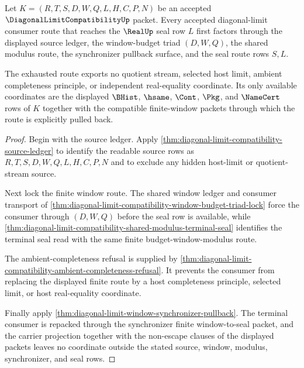 \begin{theorem}
\label{thm:diagonal-limit-compatibility-window-source-exhaustion}
Let $K=(R,T,S,D,W,Q,L,H,C,P,N)$ be an accepted $\DiagonalLimitCompatibilityUp$ packet. Every accepted diagonal-limit consumer route that reaches the $\RealUp$ seal row $L$ first factors through the displayed source ledger, the window-budget triad $(D,W,Q)$, the shared modulus route, the synchronizer pullback surface, and the seal route rows $S,L$.

The exhausted route exports no quotient stream, selected host limit, ambient completeness principle, or independent real-equality coordinate. Its only available coordinates are the displayed $\BHist$, $\hsame$, $\Cont$, $\Pkg$, and $\NameCert$ rows of $K$ together with the compatible finite-window packets through which the route is explicitly pulled back.
\end{theorem}
\begin{proof}
Begin with the source ledger. Apply \autoref{thm:diagonal-limit-compatibility-source-ledger} to identify the readable source rows as $R,T,S,D,W,Q,L,H,C,P,N$ and to exclude any hidden host-limit or quotient-stream source.

Next lock the finite window route. The shared window ledger and consumer transport of \autoref{thm:diagonal-limit-compatibility-window-budget-triad-lock} force the consumer through $(D,W,Q)$ before the seal row is available, while \autoref{thm:diagonal-limit-compatibility-shared-modulus-terminal-seal} identifies the terminal seal read with the same finite budget-window-modulus route.

The ambient-completeness refusal is supplied by \autoref{thm:diagonal-limit-compatibility-ambient-completeness-refusal}. It prevents the consumer from replacing the displayed finite route by a host completeness principle, selected limit, or host real-equality coordinate.

Finally apply \autoref{thm:diagonal-limit-window-synchronizer-pullback}. The terminal consumer is repacked through the synchronizer finite window-to-seal packet, and the carrier projection together with the non-escape clauses of the displayed packets leaves no coordinate outside the stated source, window, modulus, synchronizer, and seal rows.
\end{proof}

